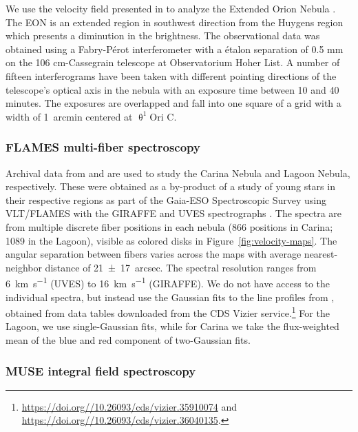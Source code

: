 \documentclass[fleqn,usenatbib, useAMS, a4paper]{mnras}
\begin{document}
We use the velocity field presented in \citet{1987A&A...176..347H} to analyze the Extended Orion Nebula \citetext{EON henceforth;  \citealp{2008Sci...319..309G}}.
The EON is an extended region in southwest direction from the Huygens region which presents a diminution in the brightness.
The observational data was obtained using a Fabry-Pérot interferometer with a étalon separation of 0.5 mm on the 106 cm-Cassegrain telescope at Observatorium Hoher List. 
A number of fifteen interferograms have been taken with different pointing directions of the telescope's optical axis in the nebula with an exposure time between 10 and 40 minutes. 
The exposures are overlapped and fall into one square of a grid with a width of \SI{1}{arcmin} centered at \(\uptheta^{1}\)Ori C.   


\subsubsection{FLAMES multi-fiber spectroscopy}
\label{sec:flames-multi-fiber}

Archival data from \citet{Damiani:2016a} and \citet{Damiani:2017b} are used
to study the Carina Nebula and Lagoon Nebula, respectively.
These were obtained as a by-product of a study of young stars in their respective regions
as part of the Gaia-ESO Spectroscopic Survey \citep{Gilmore:2012v, Randich:2013m}
using VLT/FLAMES with the GIRAFFE and UVES spectrographs \citep{2002Msngr.110....1P}.
The spectra are from multiple discrete fiber positions in each nebula
(866 positions in Carina; 1089 in the Lagoon),
visible as colored disks in Figure~\ref{fig:velocity-maps}.
The angular separation between fibers varies across the maps with
average nearest-neighbor distance of \SI{21 \pm 17}{arcsec}.
The spectral resolution ranges from  \SI{6}{km.s^{-1}} (UVES) to \SI{16}{km.s^{-1}} (GIRAFFE).
We do not have access to the individual spectra, but instead use the
Gaussian fits to the line profiles from \citep{Damiani:2016a, Damiani:2017b},
obtained from data tables downloaded from the CDS Vizier service.\footnote{%
  \url{https://doi.org//10.26093/cds/vizier.35910074} and
  \url{https://doi.org//10.26093/cds/vizier.36040135}.}
For the Lagoon, we use single-Gaussian fits, while for Carina we take the
flux-weighted mean of the blue and red component of two-Gaussian fits.


\subsubsection{MUSE integral field spectroscopy}
\label{sec:muse-integral-field}
\end{document}
